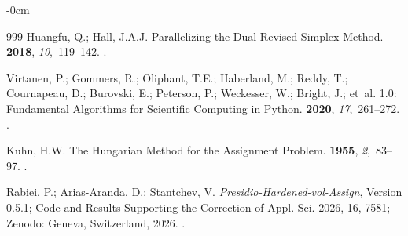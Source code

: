 \documentclass[systems,article,accept,moreauthors,pdftex]{Definitions/mdpi}
\begin{document}
\begin{adjustwidth}{-\extralength}{0cm}
\begin{thebibliography}{999}
Huangfu, Q.; Hall, J.A.J.
\newblock Parallelizing the Dual Revised Simplex Method.
 {\bf 2018}, {\em
  10},~119--142.
.

Virtanen, P.; Gommers, R.; Oliphant, T.E.; Haberland, M.; Reddy, T.;
  Cournapeau, D.; Burovski, E.; Peterson, P.; Weckesser, W.; Bright, J.;
  et~al.
 1.0: Fundamental Algorithms for Scientific Computing in
  {Python}.
 {\bf 2020}, {\em 17},~261--272.
.

Kuhn, H.W.
\newblock The {Hungarian} Method for the Assignment Problem.
 {\bf 1955}, {\em 2},~83--97.
.

Rabiei, P.; Arias-Aranda, D.; Stantchev, V.
\newblock \emph{Presidio-Hardened-vol-Assign}, Version 0.5.1; Code and Results
  Supporting the Correction of {Appl. Sci.} 2026, 16, 7581;
\newblock Zenodo: Geneva, Switzerland,  2026.
.

\end{thebibliography}

\PublishersNote{}
\end{adjustwidth}
\end{document}
